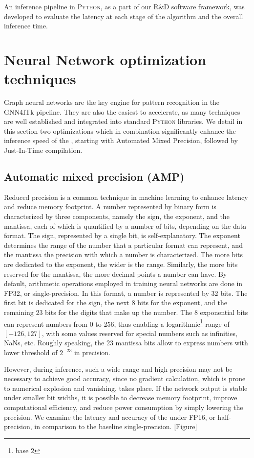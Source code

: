 An inference pipeline in \textsc{Python}, as a part of our \textsc{R\&D} software framework, was developed to evaluate the latency at each stage of the algorithm and the overall inference time.

\section{Neural Network optimization techniques}
\label{sect:opt-techniques}
Graph neural networks are the key engine for pattern recognition in the GNN4ITk pipeline. 
They are also the easiest to accelerate, as many techniques are well established and integrated into standard \textsc{Python} libraries. 
We detail in this section two optimizations which in combination significantly enhance the inference speed of the \ignn, starting with Automated Mixed Precision, followed by Just-In-Time compilation.

\subsection{Automatic mixed precision (AMP)}
Reduced precision is a common technique in machine learning to enhance latency and reduce memory footprint.
A number represented by binary form is characterized by three components, namely the sign, the exponent, and the mantissa, each of which is quantified by a number of bits, depending on the data format. 
The sign, represented by a single bit, is self-explanatory. 
The exponent determines the range of the number that a particular format can represent, and the mantissa the precision with which a number is characterized. 
The more bits are dedicated to the exponent, the wider is the range.
Similarly, the more bits reserved for the mantissa, the more decimal points a number can have.
By default, arithmetic operations employed in training neural networks are done in FP32, or single-precision.
In this format, a number is represented by 32 bits. 
The first bit is dedicated for the sign, the next 8 bits for the exponent, and the remaining 23 bits for the digits that make up the number. 
The 8 exponential bits can represent numbers from 0 to 256, thus enabling a logarithmic\footnote{base 2} range of $[-126, 127]$, with some values reserved for special numbers such as infinities, NaNs, etc.
Roughly speaking, the 23 mantissa bits allow to express numbers with lower threshold of $2^{-23}$ in precision.

However, during inference, such a wide range and high precision may not be necessary to achieve good accuracy, since no gradient calculation, which is prone to numerical explosion and vanishing, takes place. 
If the network output is stable under smaller bit widths, it is possible to decrease memory footprint, improve computational efficiency, and reduce power consumption by simply lowering the precision. 
We examine the latency and accuracy of the \ignn under FP16, or half-precision, in comparison to the baseline single-precision.
[Figure]



